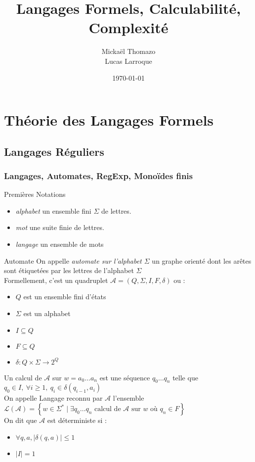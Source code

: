 \documentclass{cours}
\title{Langages Formels, Calculabilité, Complexité}
\author{Mickaël Thomazo \\ \small{Lucas Larroque}}
\date{\today}
\begin{document}
\chapter{Théorie des Langages Formels}
\section{Langages Réguliers}
\subsection{Langages, Automates, RegExp, Monoïdes finis}
\begin{définition}{Premières Notations}{}
    \begin{itemize}
    \item \emph{alphabet} un ensemble fini $\Sigma$ de lettres. 
    \item \emph{mot} une suite finie de lettres. 
    \item \emph{langage} un ensemble de mots
    \end{itemize}
\end{définition}
\begin{définition}{Automate}{}
    On appelle \emph{automate sur l'alphabet $\Sigma$} un graphe orienté dont les arêtes sont étiquetées par les lettres de l'alphabet $\Sigma$\\
    Formellement, c'est un quadruplet $\mathcal{A} = (Q, \Sigma, I, F, \delta)$ ou : \begin{itemize}
        \item $Q$ est un ensemble fini d'états
        \item $\Sigma$ est un alphabet
        \item $I \subseteq Q$
        \item $F \subseteq Q$
        \item $\delta : Q \times \Sigma \rightarrow 2^{Q}$
    \end{itemize}

    Un calcul de $\mathcal{A}$ sur $w = a_{0}\ldots a_{n}$ est une séquence $q_{0}\ldots q_{n}$ telle que $q_{0} \in I, \ \forall i \geq 1,\ q_{i} \in \delta(q_{i-1}, a_{i})$\\
    On appelle Langage reconnu par $\mathcal{A}$ l'ensemble $\mathcal{L}(\mathcal{A}) =  \left\{w \in \Sigma^{*} \mid \exists q_{0}\ldots q_{n} \text{ calcul de } \mathcal{A} \text{ sur } w \text{ où } q_{n} \in F\right\}$\\
    On dit que $\mathcal{A}$ est déterministe si :\begin{itemize}
        \item $\forall q, a, \left| \delta(q, a)\right| \leq 1$
        \item $\left| I\right| = 1$
    \end{itemize} 
\end{définition}
\end{document}
